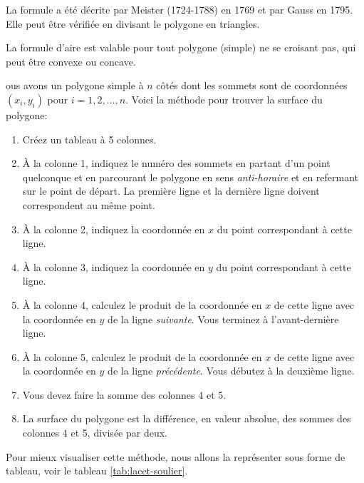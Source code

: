 \documentclass[]{book}
\providecommand{\tightlist}{%
  \setlength{\itemsep}{0pt}\setlength{\parskip}{0pt}}
\theoremstyle{definition}
\theoremstyle{definition}
\theoremstyle{definition}
\theoremstyle{remark}
\begin{document}
La formule a été décrite par Meister (1724-1788) en 1769 et par Gauss en 1795. Elle peut être vérifiée en divisant le polygone en triangles.

La formule d'aire est valable pour tout polygone (simple) ne se croisant pas, qui peut être convexe ou concave.

ous avons un polygone simple à \(n\) côtés dont les sommets sont de coordonnées \((x_i,y_i)\) pour \(i=1,2,\ldots, n\). Voici la méthode pour trouver la surface du polygone:

\begin{enumerate}
\def\labelenumi{\arabic{enumi}.}
\tightlist
\item
  Créez un tableau à 5 colonnes.
\item
  À la colonne 1, indiquez le numéro des sommets en partant d'un point quelconque et en parcourant le polygone en sens \emph{anti-horaire} et en refermant sur le point de départ. La première ligne et la dernière ligne doivent correspondent au même point.
\item
  À la colonne 2, indiquez la coordonnée en \(x\) du point correspondant à cette ligne.
\item
  À la colonne 3, indiquez la coordonnée en \(y\) du point correspondant à cette ligne.
\item
  À la colonne 4, calculez le produit de la coordonnée en \(x\) de cette ligne avec la coordonnée en \(y\) de la ligne \emph{suivante}. Vous terminez à l'avant-dernière ligne.
\item
  À la colonne 5, calculez le produit de la coordonnée en \(x\) de cette ligne avec la coordonnée en \(y\) de la ligne \emph{précédente}. Vous débutez à la deuxième ligne.
\item
  Vous devez faire la somme des colonnes 4 et 5.
\item
  La surface du polygone est la différence, en valeur absolue, des sommes des colonnes 4 et 5, divisée par deux.
\end{enumerate}

Pour mieux visualiser cette méthode, nous allons la représenter sous forme de tableau, voir le tableau \ref{tab:lacet-soulier}.
\end{document}
